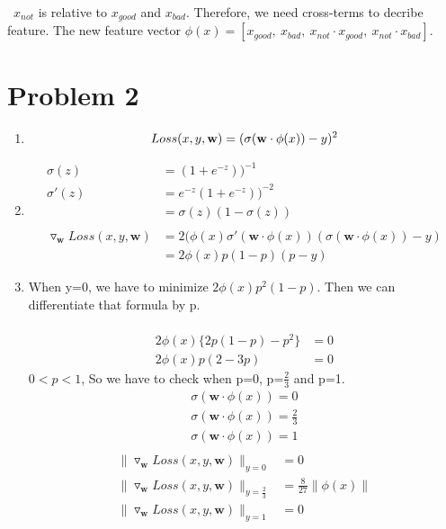 \documentclass[12pt]{article}
\begin{document}
\begin{enumerate}[label=(\alph*)]
\ $x_{not}$ is relative to $x_{good}$ and $x_{bad}$. Therefore, we need cross-terms to decribe feature. The new feature vector $\phi(x)=[x_{good},\ x_{bad},\ x_{not}\cdot x_{good},\ x_{not}\cdot x_{bad}]$.

\end{enumerate}

\section*{Problem 2}

\begin{enumerate}[label=(\alph*)]
  \item
  \begin{equation*}
    Loss(x, y, \mathbf{w}) = (\sigma(\mathbf{w}\cdot\phi(x))-y)^2\\
  \end{equation*}
  \item
  \begin{align*}
      \sigma(z) & = (1+e^{-z}))^{-1}\\
      \sigma'(z)&=e^{-z}(1+e^{-z}))^{-2}\\
      &=\sigma(z)(1-\sigma(z))\\\\
      \triangledown_{\mathbf{w}}Loss(x, y, \mathbf{w})&=2(\phi(x)\sigma'(\mathbf{w}\cdot\phi(x))(\sigma(\mathbf{w}\cdot\phi(x))-y)\\
      &=2\phi(x)p(1-p)(p-y)
  \end{align*}
  \item
  When y=0, we have to minimize $2\phi(x)p^2(1-p)$. Then we can differentiate that formula by p.\\\\
  \begin{align*}
    2\phi(x)\{ 2p(1-p)-p^2 \}&=0\\
    2\phi(x)p(2-3p)&=0
  \end{align*}
  $0 < p < 1$, So we have to check when p=0, p=$\frac {2}{3}$ and p=1.
  \begin{align*}
    \sigma(\mathbf{w}\cdot \phi(x))=  0\\
    \sigma(\mathbf{w}\cdot \phi(x))=  \frac{2}{3}\\
    \sigma(\mathbf{w}\cdot \phi(x))=  1\\
  \end{align*}
  \begin{align*}
    \parallel\triangledown_{\mathbf{w}}Loss(x, y, \mathbf{w})\parallel_{y=0}&=0\\
    \parallel\triangledown_{\mathbf{w}}Loss(x, y, \mathbf{w})\parallel_{y=\frac{2}{3}}&=\frac{8}{27}\parallel\phi(x)\parallel\\
    \parallel\triangledown_{\mathbf{w}}Loss(x, y, \mathbf{w})\parallel_{y=1}&=0\\
  \end{align*}


\end{enumerate}
\end{document}
